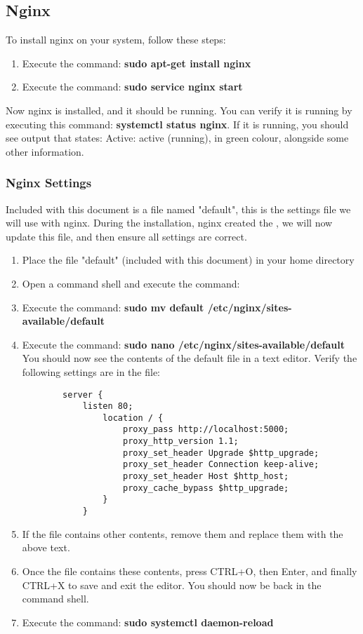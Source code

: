 \documentclass[letterpaper]{article}
\begin{document}
	\subsection{Nginx}
	To install nginx on your system, follow these steps:
	\begin{enumerate}
		\item Execute the command: \textbf{sudo apt-get install nginx}
		\item Execute the command: \textbf{sudo service nginx start}
	\end{enumerate}
	Now nginx is installed, and it should be running. You can verify it is running by executing this command: \textbf{systemctl status nginx}. If it is running, you should see output that states: Active: active (running), in green colour, alongside some other information.
	
	\subsubsection{Nginx Settings}
	Included with this document is a file named "default", this is the settings file we will use with nginx. During the installation, nginx created the , we will now update this file, and then ensure all settings are correct.
	\begin{enumerate}
		\item Place the file "default" (included with this document) in your home directory
		\item Open a command shell and execute the command: \textbf{}
		\item Execute the command: \textbf{sudo mv default /etc/nginx/sites-available/default}
		\item Execute the command: \textbf{sudo nano /etc/nginx/sites-available/default}
		You should now see the contents of the default file in a text editor. Verify the following settings are in the file:
		\begin{verbatim}
		server {
		    listen 80; 
		        location / {
		            proxy_pass http://localhost:5000; 
		            proxy_http_version 1.1; 
		            proxy_set_header Upgrade $http_upgrade; 
		            proxy_set_header Connection keep-alive; 
		            proxy_set_header Host $http_host; 
		            proxy_cache_bypass $http_upgrade; 
		        }
		    }
		\end{verbatim}
		\item If the file contains other contents, remove them and replace them with the above text.
		\item Once the file contains these contents, press CTRL+O, then Enter, and finally CTRL+X to save and exit the editor. You should now be back in the command shell.
		\item Execute the command: \textbf{sudo systemctl daemon-reload}
	\end{enumerate}
\end{document}
